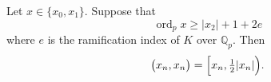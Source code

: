 Let $x \in \{x_0, x_1\}$. Suppose that
$$\operatorname{ord}_p x \geq |x_2| + 1 + 2e$$
where $e$ is the ramification index of $K$ over $\mathbb{Q}_p$. Then
$$\bigl(x_n, x_n\bigr) = \Bigl[x_n, \tfrac{1}{2} |x_n|\Bigr).$$
